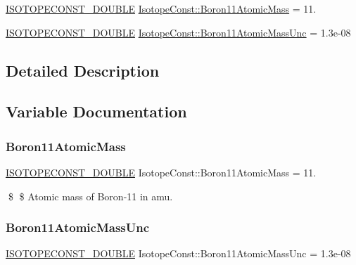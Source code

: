 \begin{DoxyCompactItemize}
\item 
\mbox{\hyperlink{group___isotope_const-_macros_ga8f45a7272ce02c0b4c65c44636ed719a}{I\+S\+O\+T\+O\+P\+E\+C\+O\+N\+S\+T\+\_\+\+D\+O\+U\+B\+LE}} \mbox{\hyperlink{group___isotope_const-_boron-_b11_ga6ee3b240306f022f86a13d9c39effa49}{Isotope\+Const\+::\+Boron11\+Atomic\+Mass}} = 11.
\item 
\mbox{\hyperlink{group___isotope_const-_macros_ga8f45a7272ce02c0b4c65c44636ed719a}{I\+S\+O\+T\+O\+P\+E\+C\+O\+N\+S\+T\+\_\+\+D\+O\+U\+B\+LE}} \mbox{\hyperlink{group___isotope_const-_boron-_b11_ga4b7f21efe5c2215139b422c2291dcdd1}{Isotope\+Const\+::\+Boron11\+Atomic\+Mass\+Unc}} = 1.\+3e-\/08
\end{DoxyCompactItemize}


\subsection{Detailed Description}


\subsection{Variable Documentation}
\mbox{\label{group___isotope_const-_boron-_b11_ga6ee3b240306f022f86a13d9c39effa49}} 
\subsubsection{\texorpdfstring{Boron11\+Atomic\+Mass}{Boron11AtomicMass}}
{\footnotesize\ttfamily \mbox{\hyperlink{group___isotope_const-_macros_ga8f45a7272ce02c0b4c65c44636ed719a}{I\+S\+O\+T\+O\+P\+E\+C\+O\+N\+S\+T\+\_\+\+D\+O\+U\+B\+LE}} Isotope\+Const\+::\+Boron11\+Atomic\+Mass = 11.}

\$ \$ Atomic mass of Boron-\/11 in amu. \mbox{\label{group___isotope_const-_boron-_b11_ga4b7f21efe5c2215139b422c2291dcdd1}} 
\subsubsection{\texorpdfstring{Boron11\+Atomic\+Mass\+Unc}{Boron11AtomicMassUnc}}
{\footnotesize\ttfamily \mbox{\hyperlink{group___isotope_const-_macros_ga8f45a7272ce02c0b4c65c44636ed719a}{I\+S\+O\+T\+O\+P\+E\+C\+O\+N\+S\+T\+\_\+\+D\+O\+U\+B\+LE}} Isotope\+Const\+::\+Boron11\+Atomic\+Mass\+Unc = 1.\+3e-\/08}

